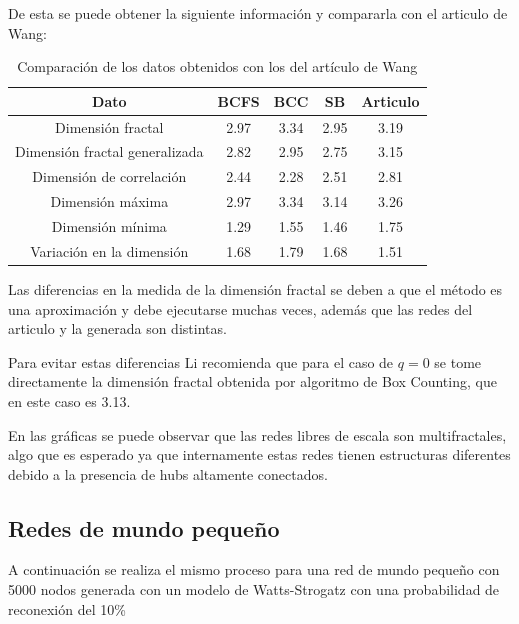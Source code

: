 De esta se puede obtener la siguiente información y compararla con el articulo de Wang\cite{Wang2012}:

\begin{table}[H]
    \centering
    \begin{tabular}{|c|c|c|c|c|}
        \hline
         \textbf{Dato}& \textbf{BCFS} & \textbf{BCC} & \textbf{SB} & \textbf{Articulo} \\
         \hline
         Dimensión fractal & 2.97 & 3.34 & 2.95 & 3.19 \\
         \hline
         Dimensión fractal generalizada & 2.82 & 2.95 & 2.75 &3.15  \\
         \hline
         Dimensión de correlación & 2.44 & 2.28 & 2.51 &2.81 \\
         \hline
         Dimensión máxima & 2.97 & 3.34 & 3.14 &3.26 \\
         \hline
         Dimensión mínima & 1.29 & 1.55 & 1.46 &1.75 \\
         \hline
         Variación en la dimensión & 1.68 & 1.79 & 1.68 &1.51 \\
         \hline
    \end{tabular}
    \caption{Comparación de los datos obtenidos con los del artículo de Wang\cite{Wang2012}}
\end{table}

Las diferencias en la medida de la dimensión fractal se deben a que el método es una aproximación y debe ejecutarse muchas veces, además que las redes del articulo y la generada son distintas.

Para evitar estas diferencias Li\cite{Li2014} recomienda que para el caso de $q=0$ se tome directamente la dimensión fractal obtenida por algoritmo de Box Counting, que en este caso es 3.13.

En las gráficas se puede observar que las redes libres de escala son multifractales, algo que es esperado ya que internamente estas redes tienen estructuras diferentes debido a la presencia de hubs altamente conectados.

\subsection{Redes de mundo pequeño}

A continuación se realiza el mismo proceso para una red de mundo pequeño con 5000 nodos generada con un modelo de Watts-Strogatz con una probabilidad de reconexión del 10\%


